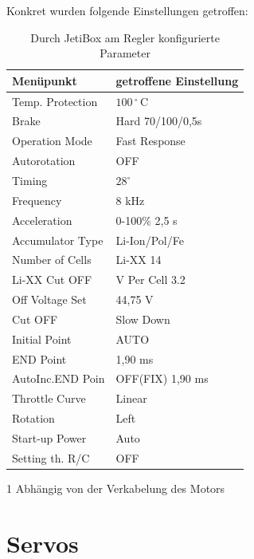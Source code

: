 Konkret wurden folgende Einstellungen getroffen:\\
\begin{table}[h]
\centering
\begin{threeparttable}
    
    \begin{tabular}{|l|l|}
    \hline
     Menüpunkt & getroffene Einstellung \\\hline
     Temp. Protection & $100\,^\circ\,\textrm{C}$\\
     Brake & Hard 70/100/0,5s\\
     Operation Mode & Fast Response\\
     Autorotation & OFF\\
     Timing & $28^\circ$\\
     Frequency & 8 kHz\\
     Acceleration & 0-100\% 2,5 s\\
     Accumulator Type & Li-Ion/Pol/Fe\\
     Number of Cells & Li-XX 14\\
     Li-XX Cut OFF & V Per Cell 3.2\\
     Off Voltage Set & 44,75 V\\
     Cut OFF & Slow Down\\
     Initial Point & AUTO\\
     END Point & 1,90 ms\\
     AutoInc.END Poin & OFF(FIX) 1,90 ms\\
     Throttle Curve & Linear\\
     Rotation & Left \tnote{1}\\
     Start-up Power & Auto\\
     Setting th. R/C & OFF\\\hline
    \end{tabular}
    \begin{tablenotes}\footnotesize 
        \item[1] Abhängig von der Verkabelung des Motors 
        \end{tablenotes}
    \end{threeparttable}
    \caption{Durch JetiBox am Regler konfigurierte Parameter}
\end{table}
\newpage


\section{Servos}